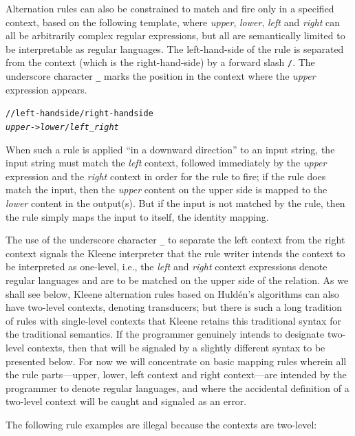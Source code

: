 Alternation rules can also be constrained to match and fire only in a specified context, based on the following
template, where \emph{upper}, \emph{lower}, \emph{left} and \emph{right} can all be arbitrarily complex regular
expressions, but all are semantically limited to be interpretable as regular languages.  The left-hand-side of the rule
is separated from the context (which is the right-hand-side) by a forward slash \texttt{/}. The underscore character
\texttt{\_} marks the position in the context where the \emph{upper} expression appears.
 

\begin{alltt}
// left-hand side / right-hand side
\emph{upper} -> \emph{lower} / \emph{left} _ \emph{right}
\end{alltt}

\noindent
When such a rule is applied ``in a downward direction'' to an input string, the input string must match the \emph{left}
context, followed immediately by the \emph{upper} expression and the \emph{right} context in order for the rule to fire; if the rule does match the input, then the
\emph{upper} content on the upper side is mapped to the
\emph{lower} content in the output(s).  But if the
input is not matched by the rule, then the rule simply maps the input to itself, the identity mapping.


The use of the underscore character \texttt{\_} to separate the left context from the right context signals the
Kleene interpreter that the rule writer intends the context to be
interpreted as one-level, i.e., the
\emph{left} and \emph{right} context expressions denote regular languages and are to be matched on the upper
side of the relation.  As we shall see below, Kleene alternation rules based on Huldén's algorithms can
also have two-level contexts, denoting transducers; but there is such a long tradition of rules with
single-level contexts that Kleene retains this traditional syntax for the traditional semantics.  If
the programmer genuinely intends to designate two-level contexts, then that will be signaled by a
slightly different syntax to be presented below.  For now we will concentrate on basic mapping rules
wherein all the rule parts---upper, lower, left context and right context---are intended
by the programmer
to denote regular languages, and where the accidental definition of a
two-level context will be caught
and signaled as an error.

The following rule examples are illegal because the contexts are two-level:

